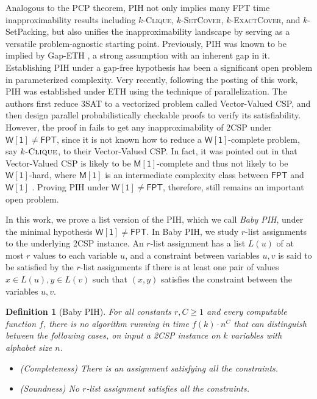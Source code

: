 \documentclass[10pt,a4paper]{article}
\newtheorem{definition}[theorem]{Definition}
\newcommand{\wone}{\mathsf{W[1]}}
\newcommand{\mone}{\mathsf{M[1]}}
\newcommand{\fpt}{\mathsf{FPT}}
\newcommand{\kclique}{\textsc{$k$-Clique}}
\newcommand{\kexact}{\textsc{$k$-ExactCover}}
\newcommand{\ksetcover}{\textsc{$k$-SetCover}}
\begin{document}
Analogous to the PCP theorem, PIH not only implies many FPT time inapproximability results including \kclique{}, \ksetcover{}, \kexact{}, and {\sc $k$-SetPacking}, but also unifies the inapproximability landscape by serving as a versatile problem-agnostic starting point.  Previously, PIH was known to be implied by Gap-ETH \cite{DM18, CFM17}, a strong assumption with an inherent gap in it. Establishing PIH under a gap-free hypothesis has been a significant open problem in parameterized complexity. Very recently, following the posting of this work, PIH was established under ETH \cite{GLR+23} using the technique of parallelization. The authors first reduce 3SAT to a vectorized problem called Vector-Valued CSP, and then design parallel probabilistically checkable proofs to verify its satisfiability. However, the proof in \cite{GLR+23} fails to get any inapproximability of 2CSP under $\wone \neq \fpt$, since it is not known how to reduce a $\wone$-complete problem, say $\kclique{}$, to their Vector-Valued CSP. In fact, it was pointed out in \cite{GLR+23} that Vector-Valued CSP is likely to be $\mone$-complete and thus not likely to be $\wone$-hard, where $\mone$ is an intermediate complexity class between $\fpt$ and $\wone$ \cite{fellows2003blow, chen2007isomorphism}. Proving PIH under $\wone \neq \fpt$, therefore, still remains an important open problem.

In this work, we prove a list version of the PIH, which we call \emph{Baby PIH}, under the minimal hypothesis $\wone \neq \fpt$. In Baby PIH, we study $r$-list assignments to the underlying 2CSP instance. An $r$-list assignment has a list $L(u)$ of at most $r$ values to each variable $u$, and a constraint between variables $u,v$ is said to be satisfied by the $r$-list assignments if there is at least one pair of values $x \in L(u), y \in L(v)$ such that $(x,y)$ satisfies the constraint between the variables $u,v$. 

\begin{definition}[Baby PIH]
For all constants $r, C \ge 1$ and every computable function $f$, there is no algorithm running in time $f(k)\cdot n^C$ that can distinguish between the following cases, on input a 2CSP instance on $k$ variables with alphabet size $n$. 
    \begin{itemize}
        \item (Completeness) There is an assignment satisfying all the constraints. 
        \item (Soundness) No $r$-list assignment satisfies all the constraints. 
    \end{itemize}
\end{definition}
\end{document}
